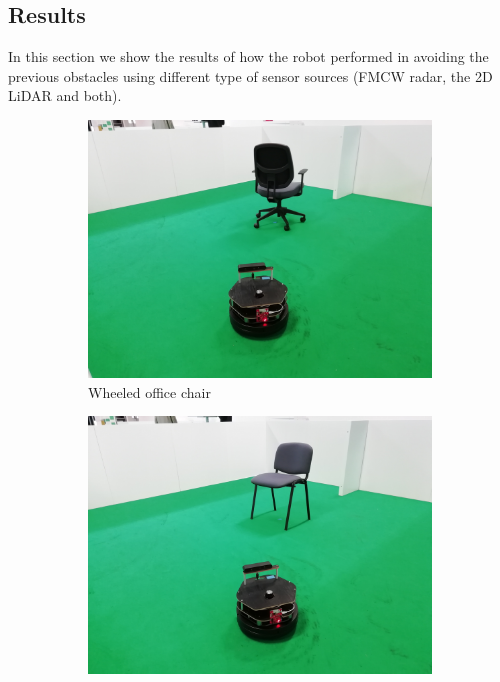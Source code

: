 \subsection{Results}
In this section we show the results of how the robot performed in avoiding the previous obstacles using different type of sensor sources (\ac{FMCW} radar, the 2D \ac{LiDAR} and both).
\begin{figure}[h!]
  \centering
  \begin{subfigure}[b]{0.3\linewidth}
    \includegraphics[width=\linewidth]{imgs/chapter5/wchair.jpg}
     \caption{Wheeled office chair}
     \label{fig::wchair}
  \end{subfigure}
  \begin{subfigure}[b]{0.3\linewidth}
    \includegraphics[width=\linewidth]{imgs/chapter5/nchair.jpg}

\end{subfigure}
\end{figure}
